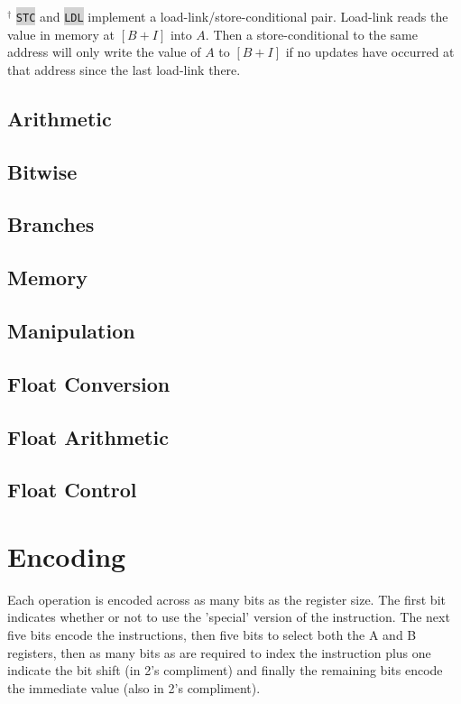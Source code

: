 \documentclass{article}
\newcommand{\labcode}[1]{\colorbox{lightgray}{\lstinline[language=lab]{#1}}}
\begin{document}
$^\dagger$ \labcode{STC} and \labcode{LDL} implement a
load-link/store-conditional pair. Load-link reads the value in memory at $[B +
I]$ into $A$. Then a store-conditional to the same address will only write the
value of $A$ to $[B + I]$ if no updates have occurred at that address since the
last load-link there.

\subsection{Arithmetic}

\subsection{Bitwise}

\subsection{Branches}

\subsection{Memory}

\subsection{Manipulation}

\subsection{Float Conversion}

\subsection{Float Arithmetic}

\subsection{Float Control}

\section{Encoding}

Each operation is encoded across as many bits as the register size. The first
bit indicates whether or not to use the 'special' version of the instruction.
The next five bits encode the instructions, then five bits to select both the A
and B registers, then as many bits as are required to index the instruction plus
one indicate the bit shift (in 2's compliment) and finally the remaining bits
encode the immediate value (also in 2's compliment).
\end{document}
